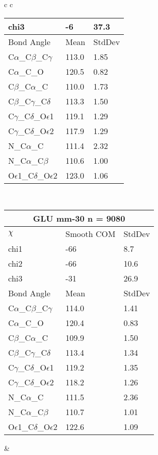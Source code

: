 \begin{longtable}{ c c }
\begin{tabular}{ l l l }
  chi3 & -6 & 37.3 \\ \midrule
  Bond Angle   & Mean     & StdDev \\ \midrule
  C$\alpha$\_C$\beta$\_C$\gamma$ & 113.0 & 1.85\\
  C$\alpha$\_C\_O & 120.5 & 0.82\\
  C$\beta$\_C$\alpha$\_C & 110.0 & 1.73\\
  C$\beta$\_C$\gamma$\_C$\delta$ & 113.3 & 1.50\\
  C$\gamma$\_C$\delta$\_O$\epsilon$1 & 119.1 & 1.29\\
  C$\gamma$\_C$\delta$\_O$\epsilon$2 & 117.9 & 1.29\\
  N\_C$\alpha$\_C & 111.4 & 2.32\\
  N\_C$\alpha$\_C$\beta$ & 110.6 & 1.00\\
  O$\epsilon$1\_C$\delta$\_O$\epsilon$2 & 123.0 & 1.06\\
  \bottomrule
  \end{tabular}
  \\
  \begin{tabular}{ l l l }
  \toprule
  \multicolumn{3}{c}{GLU \textbf{mm-30} n = 9080} \\ \toprule
  $\chi$       & Smooth COM & StdDev \\ \midrule
  chi1 & -66 & 8.7 \\ 
  chi2 & -66 & 10.6 \\ 
  chi3 & -31 & 26.9 \\ \midrule
  Bond Angle   & Mean     & StdDev \\ \midrule
  C$\alpha$\_C$\beta$\_C$\gamma$ & 114.0 & 1.41\\
  C$\alpha$\_C\_O & 120.4 & 0.83\\
  C$\beta$\_C$\alpha$\_C & 109.9 & 1.50\\
  C$\beta$\_C$\gamma$\_C$\delta$ & 113.4 & 1.34\\
  C$\gamma$\_C$\delta$\_O$\epsilon$1 & 119.2 & 1.35\\
  C$\gamma$\_C$\delta$\_O$\epsilon$2 & 118.2 & 1.26\\
  N\_C$\alpha$\_C & 111.5 & 2.36\\
  N\_C$\alpha$\_C$\beta$ & 110.7 & 1.01\\
  O$\epsilon$1\_C$\delta$\_O$\epsilon$2 & 122.6 & 1.09\\
  \bottomrule
  \end{tabular}
  &
  \\
  
\end{longtable}

